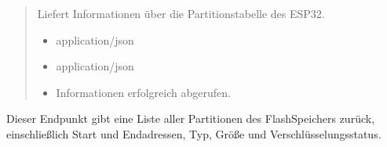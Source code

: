 \documentclass[letterpaper,10pt,english]{sphinxmanual}
\begin{document}
\begin{fulllineitems}
\label{\detokenize{agv_rest_api_info:get--api-info-esp32-partitions}}
\pysigstartsignatures
\pysigline
{}
\pysigstopsignatures\begin{quote}\begin{description}
\sphinxAtStartPar
Liefert Informationen über die Partitionstabelle des ESP32.

\begin{itemize}
\item {} 
\sphinxAtStartPar
{} \textendash{} application/json

\end{itemize}

\begin{itemize}
\item {} 
\sphinxAtStartPar
{} \textendash{} application/json

\end{itemize}

\begin{itemize}
\item {} 
\sphinxAtStartPar
{} \textendash{} Informationen erfolgreich abgerufen.

\end{itemize}

\end{description}\end{quote}

\end{fulllineitems}


\sphinxAtStartPar
{}
Dieser Endpunkt gibt eine Liste aller Partitionen des Flash\sphinxhyphen{}Speichers zurück,
einschließlich Start\sphinxhyphen{} und Endadressen, Typ, Größe und Verschlüsselungsstatus.

\sphinxAtStartPar
{}
\end{document}
